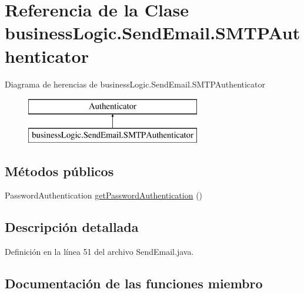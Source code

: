 \hypertarget{classbusiness_logic_1_1_send_email_1_1_s_m_t_p_authenticator}{}\section{Referencia de la Clase business\+Logic.\+Send\+Email.\+S\+M\+T\+P\+Authenticator}
\label{classbusiness_logic_1_1_send_email_1_1_s_m_t_p_authenticator}
Diagrama de herencias de business\+Logic.\+Send\+Email.\+S\+M\+T\+P\+Authenticator\begin{figure}[H]
\begin{center}
\leavevmode
\includegraphics[height=2.000000cm]{classbusiness_logic_1_1_send_email_1_1_s_m_t_p_authenticator}
\end{center}
\end{figure}
\subsection*{Métodos públicos}
\begin{DoxyCompactItemize}
\item 
Password\+Authentication \mbox{\hyperlink{classbusiness_logic_1_1_send_email_1_1_s_m_t_p_authenticator_ac12893bcb04d8840ad1616dd8c7b70de}{get\+Password\+Authentication}} ()
\end{DoxyCompactItemize}


\subsection{Descripción detallada}


Definición en la línea 51 del archivo Send\+Email.\+java.



\subsection{Documentación de las funciones miembro}
\mbox{\label{classbusiness_logic_1_1_send_email_1_1_s_m_t_p_authenticator_ac12893bcb04d8840ad1616dd8c7b70de}} 
